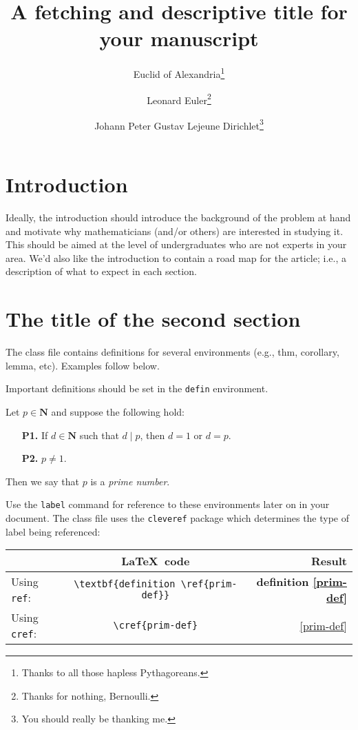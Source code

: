 \documentclass{rhumj_new}
\title[Short title]{A fetching and descriptive title for your manuscript}
\author[Euclid]{Euclid of Alexandria\thanks{Thanks to all those hapless Pythagoreans.}}
\affiliation{Ancient Greece}
\author[Euler]{Leonard Euler\thanks{Thanks for nothing, Bernoulli.}}
\affiliation{University of Basel}
\author[Dirichlet]{Johann Peter Gustav Lejeune Dirichlet\thanks{You should really be thanking me.}}
\affiliation{University of Bonn}
\begin{document}

\section{Introduction}

Ideally, the introduction should introduce the background of the problem at hand and motivate why mathematicians (and/or others) are interested in studying it. This should be aimed at the level of undergraduates who are not experts in your area. We'd also like the introduction to contain a road map for the article; i.e., a description of what to expect in each section.


\section{The title of the second section}
The class file contains definitions for several environments (e.g., {\ttfamily thm, corollary, lemma}, etc). Examples follow below.

Important definitions should be set in the \texttt{defin} environment.
\begin{defin} \label{prim-def}
Let $p \in \mathbf{N}$ and suppose the following hold:
\begin{itemize}
\item[\sffamily\bfseries P1.] If $d \in \mathbf{N}$ such that $d \mid p$, then $d = 1$ or $d=p$.
\item[\sffamily\bfseries P2.] $p \neq 1$.
\end{itemize}
Then we say that $p$ is a \emph{prime number}.
\end{defin}

Use the \texttt{label} command for reference to these environments later on in your document. The class file uses the \texttt{cleveref} package which determines the type of label being referenced:
\begin{center}
\begin{tabular}{lcr}
 & \LaTeX\ code & Result \\
 \hline
Using \texttt{ref}: & \verb|\textbf{definition \ref{prim-def}}| & \textbf{definition \ref{prim-def}} \\
Using \texttt{cref}: & \verb|\cref{prim-def}| & \cref{prim-def}
\end{tabular}
\end{center}
\end{document}
